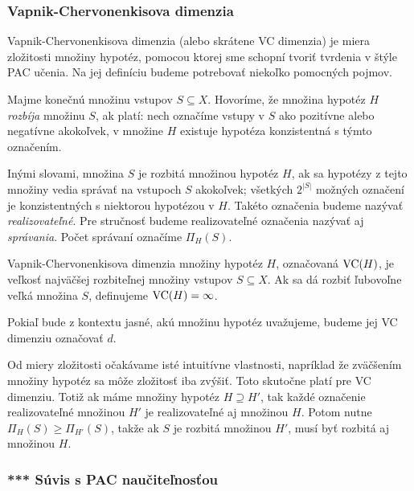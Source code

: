 \subsubsection{Vapnik-Chervonenkisova dimenzia}

Vapnik-Chervonenkisova dimenzia (alebo skrátene VC dimenzia) je miera
zložitosti množiny hypotéz, pomocou ktorej sme schopní tvoriť tvrdenia
v štýle PAC učenia. Na jej definíciu budeme potrebovať niekoľko pomocných
pojmov.

\begin{definition}
  Majme konečnú množinu vstupov $S \subseteq X$. Hovoríme, že množina
  hypotéz $H$ \emph{rozbíja} množinu $S$, ak platí: nech označíme vstupy
  v $S$ ako pozitívne alebo negatívne akokoľvek, v množine $H$ existuje
  hypotéza konzistentná s týmto označením.
\end{definition}

Inými slovami, množina $S$ je rozbitá množinou hypotéz $H$, ak sa hypotézy
z tejto množiny vedia správať na vstupoch $S$ akokoľvek; všetkých $2^{|S|}$
možných označení je konzistentných s niektorou hypotézou v $H$. Takéto
označenia budeme nazývať \emph{realizovateľné}. Pre stručnosť budeme
realizovateľné označenia nazývať aj \emph{správania}. Počet správaní
označíme $\Pi_H(S)$.

\begin{definition}
  Vapnik-Chervonenkisova dimenzia množiny hypotéz $H$, označovaná
  $\mathrm{VC}(H)$, je veľkosť najväčšej rozbiteľnej množiny vstupov $S \subseteq X$.
  Ak sa dá rozbiť ľubovoľne veľká množina $S$, definujeme $\mathrm{VC}(H) = \infty$.
\end{definition}

Pokiaľ bude z kontextu jasné, akú množinu hypotéz uvažujeme, budeme jej
VC dimenziu označovať $d$.

Od miery zložitosti očakávame isté intuitívne vlastnosti, napríklad že
zväčšením množiny hypotéz sa môže zložitosť iba zvýšiť. Toto skutočne
platí pre VC dimenziu. Totiž ak máme množiny hypotéz $H \supseteq H'$,
tak každé označenie realizovateľné množinou $H'$ je realizovateľné aj
množinou $H$. Potom nutne $\Pi_H(S) \geq \Pi_{H'}(S)$, takže ak $S$
je rozbitá množinou $H'$, musí byť rozbitá aj množinou $H$.



\subsubsection{*** Súvis s PAC naučiteľnosťou}

